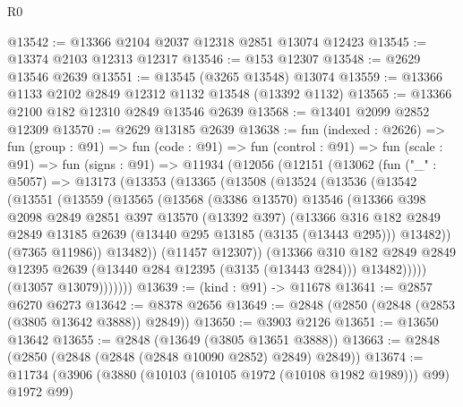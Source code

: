 \begin{lexlean}{R0}
\begin{coremodule}
@13542 := @13366 @2104 @2037 @12318 @2851 @13074 @12423
@13545 := @13374 @2103 @12313 @12317
@13546 := @153 @12307
@13548 := @2629 @13546 @2639
@13551 := @13545 (@3265 @13548) @13074
@13559 := @13366 @1133 @2102 @2849 @12312 @1132 @13548 (@13392 @1132)
@13565 := @13366 @2100 @182 @12310 @2849 @13546 @2639
@13568 := @13401 @2099 @2852 @12309
@13570 := @2629 @13185 @2639
@13638 := fun (indexed : @2626) =>
  fun (group : @91) =>
  fun (code : @91) =>
  fun (control : @91) =>
  fun (scale : @91) =>
  fun (signs : @91) =>
  @11934
    (@12056
      (@12151
        (@13062
          (fun ("_" : @5057) =>
          @13173
            (@13353
              (@13365
                (@13508
                  (@13524
                    (@13536
                      (@13542
                        (@13551
                          (@13559
                            (@13565
                              (@13568
                                (@3386 @13570)
                                @13546
                                (@13366
                                  @398
                                  @2098
                                  @2849
                                  @2851
                                  @397
                                  @13570
                                  (@13392 @397)
                                  (@13366
                                    @316
                                    @182
                                    @2849
                                    @2849
                                    @13185
                                    @2639
                                    (@13440 @295 @13185 (@3135 (@13443 @295)))
                                    @13482))
                                (@7365 @11986))
                              @13482))
                          (@11457 @12307))
                        (@13366
                          @310
                          @182
                          @2849
                          @2849
                          @12395
                          @2639
                          (@13440 @284 @12395 (@3135 (@13443 @284)))
                          @13482)))))
                (@13057 @13079)))))))
@13639 := (kind : @91) -> @11678
@13641 := @2857 @6270 @6273
@13642 := @8378 @2656
@13649 := @2848 (@2850 (@2848 (@2853 (@3805 @13642 @3888)) @2849))
@13650 := @3903 @2126
@13651 := @13650 @13642
@13655 := @2848 (@13649 (@3805 @13651 @3888))
@13663 := @2848 (@2850 (@2848 (@2848 (@2848 @10090 @2852) @2849) @2849))
@13674 := @11734 (@3906 (@3880 (@10103 (@10105 @1972 (@10108 @1982 @1989))) @99) @1972 @99)

\end{coremodule}
\end{lexlean}

